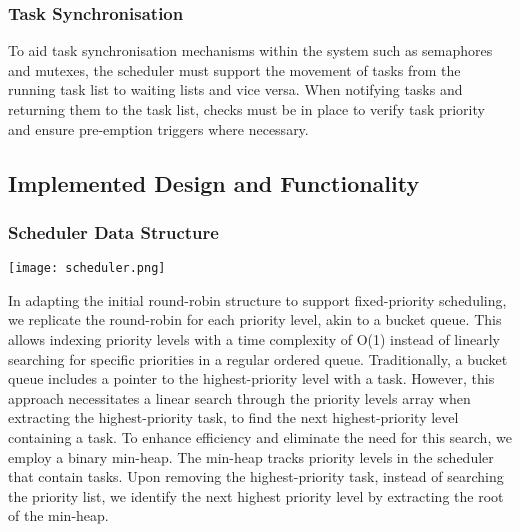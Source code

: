 \subsubsection{Task Synchronisation}
To aid task synchronisation mechanisms within the system such as semaphores and mutexes, the scheduler must support the movement of tasks from the running task list to waiting lists and vice versa. When notifying tasks and returning them to the task list, checks must be in place to verify task priority and ensure pre-emption triggers where necessary.

\subsection{Implemented Design and Functionality}
\subsubsection{Scheduler Data Structure}
\begin{center}
	\texttt{[image: scheduler.png]}
\end{center}
In adapting the initial round-robin structure to support fixed-priority scheduling, we replicate the round-robin for each priority level, akin to a bucket queue. This allows indexing priority levels with a time complexity of O(1) instead of linearly searching for specific priorities in a regular ordered queue. Traditionally, a bucket queue includes a pointer to the highest-priority level with a task. However, this approach necessitates a linear search through the priority levels array when extracting the highest-priority task, to find the next highest-priority level containing a task. \hfill\newline
To enhance efficiency and eliminate the need for this search, we employ a binary min-heap. The min-heap tracks priority levels in the scheduler that contain tasks. Upon removing the highest-priority task, instead of searching the priority list, we identify the next highest priority level by extracting the root of the min-heap.

